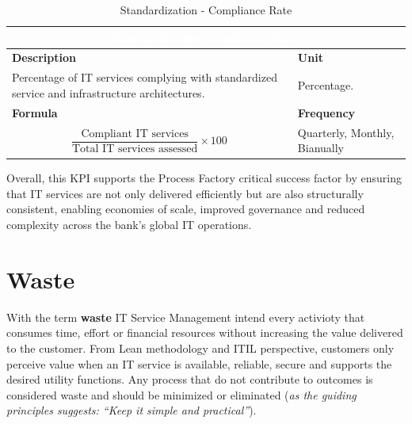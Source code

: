 \begin{table}[h]
    \centering
    \renewcommand{\arraystretch}{1.6}
    \setlength{\arrayrulewidth}{0.6pt}

    \begin{tabularx}{\textwidth}{|X|X|}
    \hline
    \multicolumn{2}{|c|}{\cellcolor{mcblue}\textcolor{white}{\textbf{Standardization Compliance Rate}}} \\ \hline

    \rowcolor{mclightgray}
    \textbf{Description} & \textbf{Unit} \\ \hline
    Percentage of IT services complying with standardized service and infrastructure architectures. &
    Percentage. \\ \hline

    \rowcolor{mclightgray}
    \textbf{Formula} & \textbf{Frequency} \\ \hline
    \[
        \frac{\text{Compliant IT services}}{\text{Total IT services assessed}} \times 100
    \]
     &
    Quarterly, Monthly, Bianually \\ \hline

    \end{tabularx}

    \caption{Standardization - Compliance Rate}
    \label{tab:measurement_StandardizationComplianceRate}
\end{table}

Overall, this KPI supports the Process Factory critical success factor by ensuring that IT services are not only delivered efficiently but are also structurally consistent, enabling economies of scale, improved governance and reduced complexity across the bank's global IT operations. 




\section{Waste}
\label{subs:waste}

With the term \textbf{waste} IT Service Management intend every activioty that consumes time, effort or financial resources without increasing the value delivered to the customer. From Lean methodology and ITIL perspective, customers only perceive value when an IT service is available, reliable, secure and supports the desired utility functions. 
Any process that do not contribute to outcomes is considered waste and should be minimized or eliminated (\textit{as the guiding principles suggests: ``Keep it simple and practical''}).

